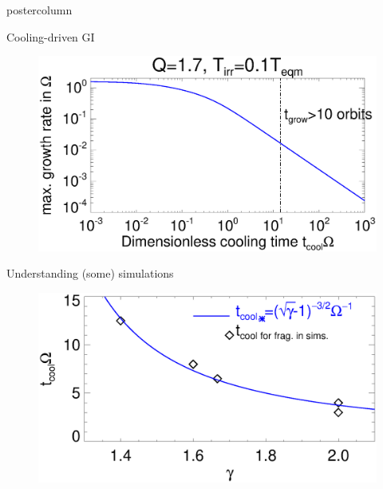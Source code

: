 \documentclass[final,hyperref={pdfpagelabels=false}]{beamer}
\begin{document}
\begin{frame}
\begin{columns}
\begin{column}{.49\textwidth}
\begin{beamercolorbox}[center,wd=\textwidth]{postercolumn}
\begin{minipage}[T]{.95\textwidth}
{            \begin{block}{{\Large Cooling-driven GI}}
                \justifying
                \begin{figure}
                  \includegraphics[width=\linewidth,clip=true,trim=0cm 0cm 0cm 0cm]{figures/2dinvisc_theta}
                \end{figure}
              \end{block}
              
            \begin{block}{{\Large Understanding (some) simulations}}
              \justifying
              \begin{figure}
                  \includegraphics[width=\linewidth,clip=true,trim=0cm 0cm 0cm 1cm]{figures/tcool}
                \end{figure}
            \end{block}
            
}
\end{minipage}
\end{beamercolorbox}
\end{column}
\end{columns}
\end{frame}
\end{document}
